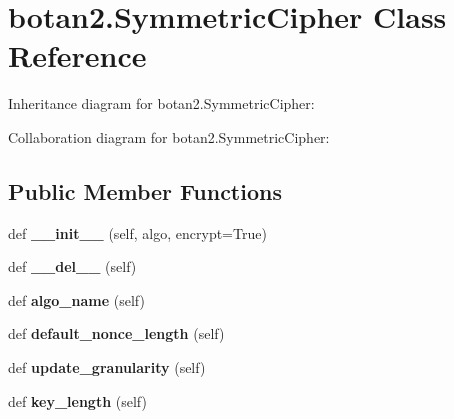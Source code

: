 \hypertarget{classbotan2_1_1_symmetric_cipher}{}\section{botan2.\+Symmetric\+Cipher Class Reference}
\label{classbotan2_1_1_symmetric_cipher}


Inheritance diagram for botan2.\+Symmetric\+Cipher\+:


Collaboration diagram for botan2.\+Symmetric\+Cipher\+:
\subsection*{Public Member Functions}
\begin{DoxyCompactItemize}
\item 
\mbox{\label{classbotan2_1_1_symmetric_cipher_af898d7520aee2140304b11ec1bf5d7ce}} 
def {\bfseries \+\_\+\+\_\+init\+\_\+\+\_\+} (self, algo, encrypt=True)
\item 
\mbox{\label{classbotan2_1_1_symmetric_cipher_ac31fa0a0a53c81585de0ac03b322e87d}} 
def {\bfseries \+\_\+\+\_\+del\+\_\+\+\_\+} (self)
\item 
\mbox{\label{classbotan2_1_1_symmetric_cipher_ae520645c752e38ee79d390052e9691ac}} 
def {\bfseries algo\+\_\+name} (self)
\item 
\mbox{\label{classbotan2_1_1_symmetric_cipher_a788cd454eeb32ac481c3034683ef0a55}} 
def {\bfseries default\+\_\+nonce\+\_\+length} (self)
\item 
\mbox{\label{classbotan2_1_1_symmetric_cipher_a35cbfd725581758cacdb55a9edfe0b79}} 
def {\bfseries update\+\_\+granularity} (self)
\item 
\mbox{\label{classbotan2_1_1_symmetric_cipher_a070854edc3db3454abcdef910ec2d8d5}} 
def {\bfseries key\+\_\+length} (self)
\item 
\mbox{\label{classbotan2_1_1_symmetric_cipher_a74b2a197812ac5ef7253fd463f858dec}} 

\end{DoxyCompactItemize}
